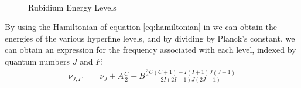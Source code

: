 \documentclass[12pt]{article}
\begin{document}
\begin{figure}%
	\centering
	\,
	\caption{Rubidium Energy Levels}%
	\label{fig:RbEnergy}%
\end{figure}

By using the Hamiltonian of equation \ref{eq:hamiltonian} in we can obtain the energies of the various hyperfine levels, and by dividing by Planck's constant, we can obtain an expression for the frequency associated with each level, indexed by quantum numbers $J$ and $F$:
\begin{align*}
	\nu_{J,F} &= \nu_J + A\frac{C}{2} + B \frac{\frac{3}{4}C(C+1) - I(I+1)J(J+1)}{2I(2I-1)J(2J-1)}
\end{align*}
\end{document}
